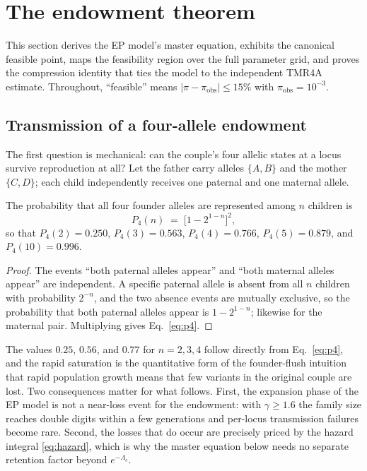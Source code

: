 \section{The endowment theorem}\label{sec:endo}

This section derives the EP model's master equation, exhibits the canonical
feasible point, maps the feasibility region over the full parameter grid,
and proves the compression identity that ties the model to the independent
TMR4A estimate. Throughout, ``feasible'' means
$|\pi - \pi_{\mathrm{obs}}| \le 15\%$ with $\pi_{\mathrm{obs}} = 10^{-3}$.

\subsection{Transmission of a four-allele endowment}\label{sec:trans}
The first question is mechanical: can the couple's four allelic states at a
locus survive reproduction at all? Let the father carry alleles $\{A, B\}$
and the mother $\{C, D\}$; each child independently receives one paternal
and one maternal allele.

\begin{proposition}\label{prop:trans}
The probability that all four founder alleles are represented among $n$
children is
\begin{equation}\label{eq:p4}
P_4(n) \;=\; \bigl[1 - 2^{1-n}\bigr]^2 ,
\end{equation}
so that $P_4(2) = 0.250$, $P_4(3) = 0.563$, $P_4(4) = 0.766$,
$P_4(5) = 0.879$, and $P_4(10) = 0.996$.
\end{proposition}

\begin{proof}
The events ``both paternal alleles appear'' and ``both maternal alleles
appear'' are independent. A specific paternal allele is absent from all $n$
children with probability $2^{-n}$, and the two absence events are
mutually exclusive, so the probability that both paternal alleles appear is
$1 - 2^{1-n}$; likewise for the maternal pair. Multiplying gives
Eq.~\eqref{eq:p4}.
\end{proof}

The values $0.25$, $0.56$, and $0.77$ for $n = 2, 3, 4$ follow directly
from Eq.~\eqref{eq:p4}, and the rapid saturation is the quantitative form
of the founder-flush intuition that rapid population growth means that few
variants in the original couple are lost. Two consequences matter for what
follows. First,
the expansion phase of the EP model is not a near-loss event for the
endowment: with $\gamma \ge 1.6$ the family size reaches double digits
within a few generations and per-locus transmission failures become rare.
Second, the losses that do occur are precisely priced by the hazard
integral \eqref{eq:hazard}, which is why the master equation below needs no
separate retention factor beyond $e^{-\Lambda_c}$.

